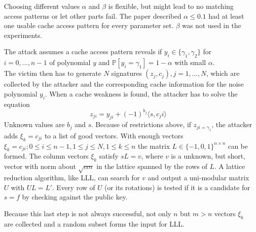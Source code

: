 Choosing different values $\alpha$ and $\beta$ is flexible, but might lead to no matching access patterns or let other parts fail. The paper described $\alpha \le 0.1$ had at least one usable cache access pattern for every parameter set. $\beta$ was not used in the experiments.

The attack assumes a cache access pattern reveals if $y_i \in \{\gamma_1, \gamma_2\}$ for $i = 0,...,n-1$ of polynomial $y$ and $\mathbb{P}[y_i = \gamma_1] = 1- \alpha$ with small $\alpha$. \\
The victim then has to generate $N$ signatures $(z_j, c_j), j= 1,...,N$, which are collected by the attacker and the corresponding cache information for the noise polynomial $y_i$. When a cache weakness is found, the attacker has to solve the equation 
\begin{equation*}
	z_{ji} = y_{ji} + (-1)^{b_j}\langle s,c_ji \rangle
\end{equation*}
Unknown values are $b_j$ and $s$. Because of restrictions above, if $z_{ji = \gamma_1}$, the attacker adds $\xi_k = c_{ji}$ to a list of good vectors. With enough vectors $\xi_k = c_{ji}; 0 \le i \le n-1, 1 \le j \le N, 1 \le k \le n$ the matrix $L \in \{-1,0,1\}^{n \times n}$ can be formed. The column vectors $\xi_k$ satisfy $sL = v$, where $v$ is a unknown, but short, vector with norm about $\sqrt{\alpha n}$ in the lattice spanned by the rows of $L$. A lattice reduction algorithm, like LLL, can search for $v$ and output a uni-modular matrix $U$ with $UL = L'$. Every row of $U$ (or its rotations) is tested if it is a candidate for $s=f$ by checking against the public key.

Because this last step is not always successful, not only $n$ but $m>n$ vectors $\xi_k$ are collected and a random subset forms the input for LLL.

